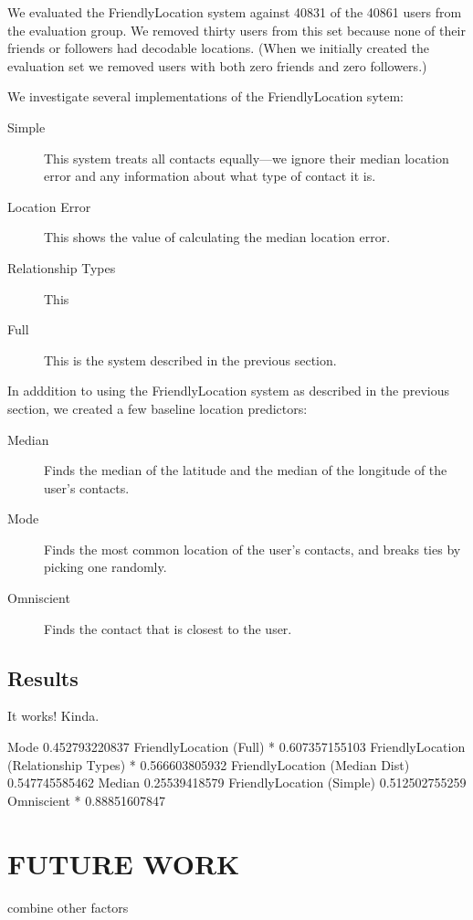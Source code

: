 \documentclass{sig-alternate}
\begin{document}
We evaluated the FriendlyLocation system against 40831 of the 40861 users from the evaluation group.
We removed thirty users from this set because none of their friends or
followers had decodable locations.
(When we initially created the evaluation
set we removed users with both zero friends and zero followers.)

We investigate several implementations of the FriendlyLocation sytem:
\begin{description}
\item[Simple] This system treats all contacts equally---we ignore their median location error and any information about what type of contact it is.
\item[Location Error] This shows the value of calculating the median location error.
\item[Relationship Types] This 
\item[Full] This is the system described in the previous section.
\end{description}

In adddition to using the FriendlyLocation system as described in the previous section, we created a few baseline location predictors:
\begin{description}
\item[Median] Finds the median of the latitude and the median of the longitude of the user's contacts.
\item[Mode] Finds the most common location of the user's contacts, and breaks ties by picking one randomly.
\item[Omniscient] Finds the contact that is closest to the user.
\end{description}

\subsection{Results}
\begin{figure}
\centering
{}
\caption{
}
\label{fig:FinalResults}
\end{figure}

It works! Kinda.

Mode 0.452793220837
FriendlyLocation (Full) * 0.607357155103
FriendlyLocation (Relationship Types) * 0.566603805932
FriendlyLocation (Median Dist) 0.547745585462
Median 0.25539418579
FriendlyLocation (Simple) 0.512502755259
Omniscient * 0.88851607847


\section{FUTURE WORK}
combine other factors


 
\end{document}
